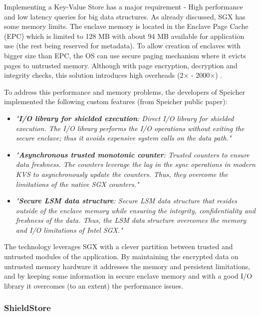 Implementing a Key-Value Store has a major requirement - High performance and low latency queries for big data structures. As already discussed, \gls{SGX} has some memory limits. The enclave memory is located in the Enclave Page Cache (\gls{EPC}) which is limited to 128 \gls{MB} with about 94 \gls{MB} available for application use (the rest being reserved for metadata). To allow creation of enclaves with bigger size than \gls{EPC}, the \gls{OS}  can use secure paging mechanism where it evicts pages to untrusted memory. Although with page encryption, decryption and integrity checks, this solution introduces high overheads (2× - 2000×) \cite{scone:1}.

To address this performance and memory problems, the developers of Speicher implemented the following custom features (from Speicher public paper):

\begin{itemize}
	\item \textit{"\textbf{I/O library for shielded execution}: Direct \gls{I/O} library for shielded execution. The \gls{I/O} library performs the \gls{I/O} operations without exiting the secure enclave; thus it avoids expensive system calls on the data path."}
	
	\item \textit{"\textbf{Asynchronous trusted monotonic counter}: Trusted counters to ensure data freshness. The counters leverage the lag in the sync operations in modern \gls{KVS} to asynchronously update the counters. Thus, they overcome the limitations of the native \gls{SGX} counters."}
	
	\item \textit{"\textbf{Secure \gls{LSM} data structure}: Secure \gls{LSM} data structure that resides outside of the enclave memory while ensuring the integrity, confidentiality and freshness of the data. Thus, the \gls{LSM} data structure overcomes the memory and \gls{I/O} limitations of Intel \gls{SGX}."}
\end{itemize}

The technology leverages \gls{SGX} with a clever partition between trusted and untrusted modules of the application. By maintaining the encrypted data on untrusted memory hardware it addresses the memory and persistent limitations, and by keeping some information in secure enclave memory and with a good \gls{I/O} library it overcomes (to an extent) the performance issues.

\subsubsection{ShieldStore}
\label{sssec:shieldstore}

